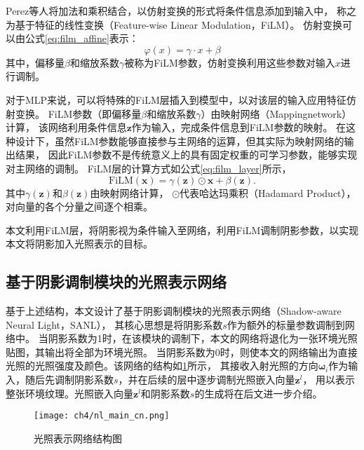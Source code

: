 Perez等人\cite{Perez_2018}将加法和乘积结合，以仿射变换的形式将条件信息添加到输入中，
称之为基于特征的线性变换（Feature-wise Linear Modulation，FiLM）。
仿射变换可以由公式\eqref{eq:film_affine}表示：
\begin{equation}
\label{eq:film_affine}
\varphi(x)=\gamma\cdot x+\beta
\end{equation}
其中，偏移量$\beta$和缩放系数$\gamma$被称为FiLM参数，仿射变换利用这些参数对输入$x$进行调制。

对于MLP来说，可以将特殊的FiLM层插入到模型中，以对该层的输入应用特征仿射变换。
FiLM参数（即偏移量$\beta$和缩放系数$\gamma$）由映射网络（Mappingnetwork）计算，
该网络利用条件信息$\boldsymbol{z}$作为输入，完成条件信息到FiLM参数的映射。
在这种设计下，虽然FiLM参数能够直接参与主网络的运算，但其实际为映射网络的输出结果，
因此FiLM参数不是传统意义上的具有固定权重的可学习参数，能够实现对主网络的调制。
FiLM层的计算方式如公式\eqref{eq:film_layer}所示，
\begin{equation}
\label{eq:film_layer}
\mathrm{FiLM}(\boldsymbol{x})=\gamma(\boldsymbol{z})\odot \boldsymbol{x}+\beta(\boldsymbol{z}).
\end{equation}
其中$\gamma(\boldsymbol{z})$和$\beta(\boldsymbol{z})$由映射网络计算，
$\odot$代表哈达玛乘积（Hadamard Product），对向量的各个分量之间逐个相乘。

本文利用FiLM层，将阴影视为条件输入至网络，利用FiLM调制阴影参数，以实现本文将阴影加入光照表示的目标。

\subsection{基于阴影调制模块的光照表示网络}

基于上述结构，本文设计了基于阴影调制模块的光照表示网络（Shadow-aware Neural Light，SANL），
其核心思想是将阴影系数$s$作为额外的标量参数调制到网络中。
当阴影系数为1时，在该模块的调制下，本文的网络将退化为一张环境光照贴图，其输出将全部为环境光照。
当阴影系数为0时，则使本文的网络输出为直接光照的光照强度及颜色。该网络的结构如\ref{fig:nl_main_cn}所示，
其接收入射光照的方向${\boldsymbol{\omega}}_i$作为输入，随后先调制阴影系数$s$，并在后续的层中逐步调制光照嵌入向量${\boldsymbol{z}}^l$，
用以表示整张环境纹理。光照嵌入向量${\boldsymbol{z}}^l$和阴影系数$s$的生成将在后文进一步介绍。

\begin{figure}[htb]
  \centering
  \texttt{[image: ch4/nl\_main\_cn.png]}
  \caption{光照表示网络结构图}
  \label{fig:nl_main_cn}
\end{figure}

